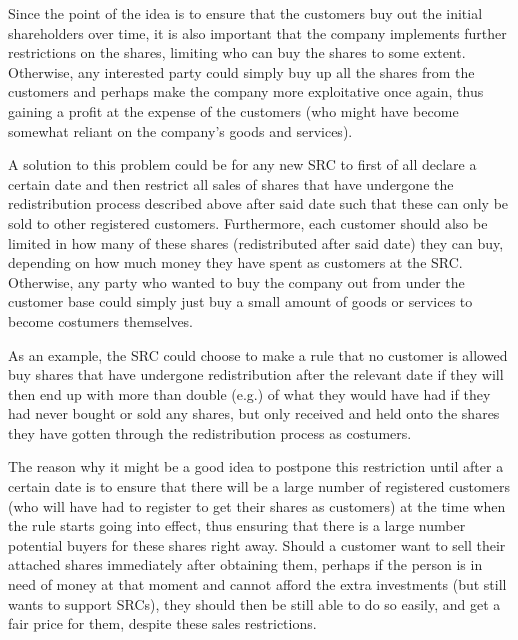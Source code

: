 \documentclass{article}
\begin{document}
Since the point of the idea is to ensure that the customers buy out the initial shareholders over time, it is also important that the company implements further restrictions on the shares, limiting who can buy the shares to some extent. Otherwise, any interested party could simply buy up all the shares from the customers and perhaps make the company more exploitative once again, thus gaining a profit at the expense of the customers (who might have become somewhat reliant on the company's goods and services). 

A solution to this problem could be for any new SRC to first of all declare a certain date and then restrict all sales of shares that have undergone the redistribution process described above after said date such that these can only be sold to other registered customers. 
Furthermore, each customer should also be limited in how many of these shares (redistributed after said date) they can buy, depending on how much money they have spent as customers at the SRC. 
Otherwise, any party who wanted to buy the company out from under the customer base could simply just buy a small amount of goods or services to become costumers themselves.
 
As an example, the SRC could choose to make a rule that no customer is allowed buy shares that have undergone redistribution after the relevant date if they will then end up with more than double (e.g.) of what they would have had if they had never bought or sold any shares, but only received and held onto the shares they have gotten through the redistribution process as costumers. 

The reason why it might be a good idea to postpone this restriction until after a certain date is to ensure that there will be a large number of registered customers (who will have had to register to get their shares as customers) at the time when the rule starts going into effect, thus ensuring that there is a large number potential buyers for these shares right away. Should a customer want to sell their attached shares immediately after obtaining them, perhaps if the person is in need of money at that moment and cannot afford the extra investments (but still wants to support SRCs), they should then be still able to do so easily, and get a fair price for them, despite these sales restrictions.
 
\end{document}

